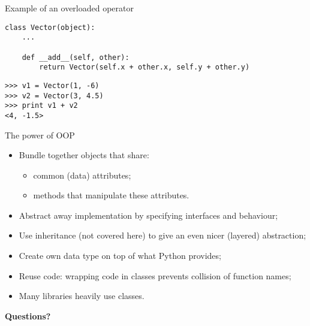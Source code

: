 \documentclass{beamer}
\begin{document}
\begin{frame}[fragile]{Example of an overloaded operator}
\begin{verbatim}
class Vector(object):
    ...

    def __add__(self, other):
        return Vector(self.x + other.x, self.y + other.y)
\end{verbatim}

\bigskip

\begin{verbatim}
>>> v1 = Vector(1, -6)
>>> v2 = Vector(3, 4.5)
>>> print v1 + v2
<4, -1.5>
\end{verbatim}
\end{frame}

\begin{frame}{The power of OOP}
\begin{itemize}
\item \textcolor{pms280_compl}{Bundle} together objects that share:
\begin{itemize}
\item common (data) attributes;
\item methods that manipulate these attributes.
\end{itemize}

\item \textcolor{pms280_compl}{Abstract away} implementation by
specifying interfaces and behaviour;

\item Use \textcolor{pms280_compl}{inheritance} (not covered here)
to give an even nicer (layered) abstraction;

\item \textcolor{pms280_compl}{Create} own data type on top of what
Python provides;

\item \textcolor{pms280_compl}{Reuse} code: wrapping code in classes
prevents collision of function names;

\item Many \textcolor{pms280_compl}{libraries} heavily use classes.
\end{itemize}

\vfill

\begin{center}
\textcolor{pms280}{\Large \textbf{Questions?}}
\end{center}
\end{frame}
\end{document}
